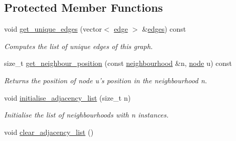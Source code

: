 \subsection*{Protected Member Functions}
\begin{DoxyCompactItemize}
\item 
void \hyperlink{classlgraph_1_1utils_1_1udgraph_af3819695aa174eb4d2b6b69da5015a46}{get\-\_\-unique\-\_\-edges} (vector$<$ \hyperlink{namespacelgraph_1_1utils_a6510284ce1b1ae5dc97ce5d2de426e10}{edge} $>$ \&\hyperlink{classlgraph_1_1utils_1_1uxgraph_ade877f3a9cf71d844cfe7b6c4f8aae10}{edges}) const 
\begin{DoxyCompactList}\small\item\em Computes the list of unique edges of this graph. \end{DoxyCompactList}\item 
size\-\_\-t \hyperlink{classlgraph_1_1utils_1_1xxgraph_aac7ef2134cad9529869f1334de7892d9}{get\-\_\-neighbour\-\_\-position} (const \hyperlink{namespacelgraph_1_1utils_a0f2ef47028a466d26841709e705390ac}{neighbourhood} \&n, \hyperlink{namespacelgraph_1_1utils_a7bd66ede3805ef121bc2835bd48de0cf}{node} u) const 
\begin{DoxyCompactList}\small\item\em Returns the position of node {\itshape u's} position in the neighbourhood {\itshape n}. \end{DoxyCompactList}\item 
\hypertarget{classlgraph_1_1utils_1_1xxgraph_a2201aaff5e9ffa29a9b3abfde705dd46}{void \hyperlink{classlgraph_1_1utils_1_1xxgraph_a2201aaff5e9ffa29a9b3abfde705dd46}{initialise\-\_\-adjacency\-\_\-list} (size\-\_\-t n)}\label{classlgraph_1_1utils_1_1xxgraph_a2201aaff5e9ffa29a9b3abfde705dd46}

\begin{DoxyCompactList}\small\item\em Initialise the list of neighbourhoods with {\itshape n} instances. \end{DoxyCompactList}\item 
\hypertarget{classlgraph_1_1utils_1_1xxgraph_a6523402d0ec66918b95de23d2bee38fc}{void \hyperlink{classlgraph_1_1utils_1_1xxgraph_a6523402d0ec66918b95de23d2bee38fc}{clear\-\_\-adjacency\-\_\-list} ()}\label{classlgraph_1_1utils_1_1xxgraph_a6523402d0ec66918b95de23d2bee38fc}


\end{DoxyCompactItemize}
